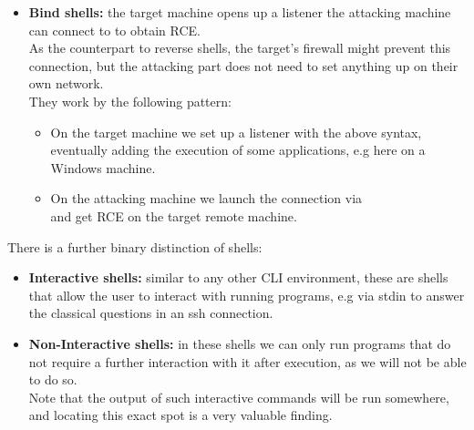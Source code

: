 \documentclass[../../WriteUp.tex]{subfiles}
\begin{document}
{\begin{itemize}
They work as follows: 
	\begin{itemize}
	\item On the attacking machine we set up a so-called reverse listener to catch the shell via\\
	\\
	(usually with port 443 as the default for examples)
	\item On the target machine we send a reverse shell, be it through a CLI (not too likely) or rather a remote website or similar with the syntax:\\
	\end{itemize}
\item \textbf{Bind shells:} the target machine opens up a listener the attacking machine can connect to to obtain RCE.\\
As the counterpart to reverse shells, the target's firewall might prevent this connection, but the attacking part does not need to set anything up on their own network.\\
They work by the following pattern:
	\begin{itemize}
	\item On the target machine we set up a listener with the above syntax, eventually adding the execution of some applications, e.g here  on a Windows machine.\\
	\item On the attacking machine we launch the connection via \\
	and get RCE on the target remote machine.
	\end{itemize}
\end{itemize}
There is a further binary distinction of shells:
\begin{itemize}
\item \textbf{Interactive shells:} similar to any other CLI environment, these are shells that allow the user to interact with running programs, e.g via stdin to answer the classical  questions in an ssh connection.
\item \textbf{Non-Interactive shells:} in these shells we can only run programs that do not require a further interaction with it after execution, as we will not be able to do so. \\
Note that the output of such interactive commands will be run somewhere, and locating this exact spot is a very valuable finding.
\end{itemize}

}
\end{document}
